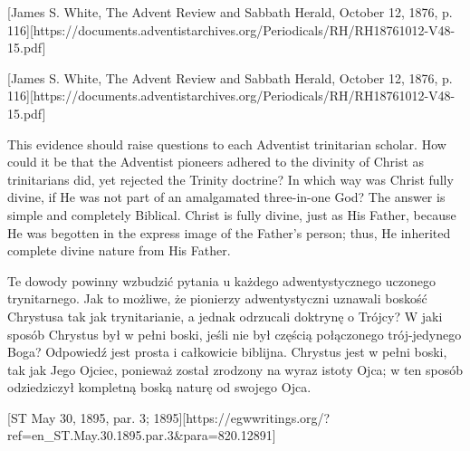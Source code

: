 [James S. White, The Advent Review and Sabbath Herald, October 12, 1876, p. 116][https://documents.adventistarchives.org/Periodicals/RH/RH18761012-V48-15.pdf]


[James S. White, The Advent Review and Sabbath Herald, October 12, 1876, p. 116][https://documents.adventistarchives.org/Periodicals/RH/RH18761012-V48-15.pdf]


This evidence should raise questions to each Adventist trinitarian scholar. How could it be that the Adventist pioneers adhered to the divinity of Christ as trinitarians did, yet rejected the Trinity doctrine? In which way was Christ fully divine, if He was not part of an amalgamated three-in-one God? The answer is simple and completely Biblical. Christ is fully divine, just as His Father, because He was begotten in the express image of the Father’s person; thus, He inherited complete divine nature from His Father.


Te dowody powinny wzbudzić pytania u każdego adwentystycznego uczonego trynitarnego. Jak to możliwe, że pionierzy adwentystyczni uznawali boskość Chrystusa tak jak trynitarianie, a jednak odrzucali doktrynę o Trójcy? W jaki sposób Chrystus był w pełni boski, jeśli nie był częścią połączonego trój-jedynego Boga? Odpowiedź jest prosta i całkowicie biblijna. Chrystus jest w pełni boski, tak jak Jego Ojciec, ponieważ został zrodzony na wyraz istoty Ojca; w ten sposób odziedziczył kompletną boską naturę od swojego Ojca.


[ST May 30, 1895, par. 3; 1895][https://egwwritings.org/?ref=en\_ST.May.30.1895.par.3&para=820.12891]


